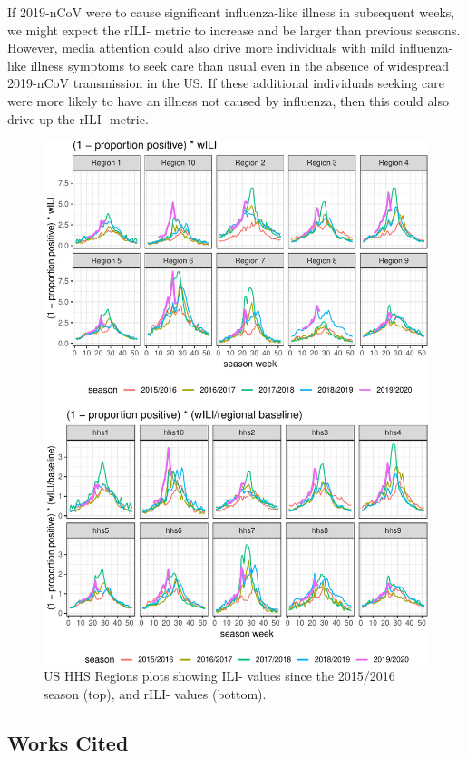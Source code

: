\documentclass[]{article}
\begin{document}
If 2019-nCoV were to cause significant influenza-like illness in
subsequent weeks, we might expect the rILI- metric to increase and be
larger than previous seasons. However, media attention could also drive
more individuals with mild influenza-like illness symptoms to seek care
than usual even in the absence of widespread 2019-nCoV transmission in
the US. If these additional individuals seeking care were more likely to
have an illness not caused by influenza, then this could also drive up
the rILI- metric.

\begin{figure}
\centering
\includegraphics{ili-labtest-report_files/figure-latex/all-region-plot-ILI--1.pdf}
\caption{\label{fig:all-region-plot}US HHS Regions plots showing ILI-
values since the 2015/2016 season (top), and rILI- values (bottom).}
\end{figure}

\hypertarget{works-cited}{%
\subsection{Works Cited}\label{works-cited}}
\end{document}

